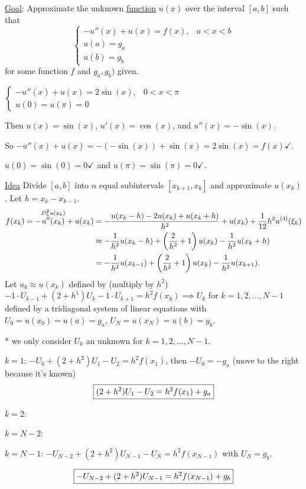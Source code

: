 \documentclass[]{article}
\begin{document}
\ul{Goal}: Approximate the unknown \ul{function} $u(x)$ over the interval $[a,b]$ such that
$$ \begin{cases} -u''(x) + u(x) = f(x), & a<x<b \\ u(a) = g_a \\ u(b) = g_b \end{cases} $$
for some function $f$ and $g_a,g_b)$ given.
\begin{example}
	$\begin{cases} -u''(x)+u(x)=2\sin(x), & 0<x<\pi \\ u(0)=u(\pi)=0 \end{cases} $
	
	Then $u(x) = \sin(x)$, $u'(x) = \cos(x)$, and $u''(x)=-\sin(x)$.
	
	So $-u''(x)+u(x) = -(-\sin(x))+\sin(x) = 2\sin(x) = f(x) \checkmark$.
	
	$u(0)=\sin(0)=0\checkmark$ and $u(\pi)=\sin(\pi)=0\checkmark$.
\end{example}
\ul{Idea} Divide $[a,b]$ into $n$ equal subintervals $[x_{k+1},x_k]$ and approximate $u(x_k)$.
Let $h=x_k-x_{k-1}$.
\begin{align*}
	f(x_k) = -\overset{D_h^2u(x_k)}{u''(x_k)} + u(x_k) 
		   &= -\frac{u(x_k-h)-2u(x_k)+u(x_k+h)}{h^2} + u(x_k) + \frac1{12}h^2 u^{(4)}(\xi_k) \\
		   &\approx -\frac1{h^2}u(x_k-h) + \left(\frac2{h^2}+1\right)u(x_k) - \frac1{h^2}u(x_k+h) \\
		   &= -\frac1{h^2}u(x_{k-1}) + \left(\frac2{h^2}+1\right)u(x_k) - \frac1{h^2}u(x_{k+1}).
\end{align*}
Let $u_k \approx u(x_k)$ defined by (multiply by $h^2$)
$ -1\cdot U_{k-1} + (2+h^1)U_k-1\cdot U_{k+1} = h^2f(x_k) \implies U_k$ for $k=1,2,\dots,N-1$ defined by a tridiagonal system of linear equations with $U_0=u(x_0)=u(a)=g_a$, $U_N=u(x_N)=u(b)=g_b$.

$*$ we only consider $U_k$ an unknown for $k=1,2,\dots,N-1$.

\ul{$k=1$}: $-U_0+(2+h^2)U_1-U_2=h^2f(x_1)$, then $-U_0=-g_a$ (move to the right because it's known) $$\fbox{$(2+h^2)U_1-U_2=h^2f(x_1)+g_a$}$$

\ul{$k=2$}: 

\ul{$k=N-2$}: 

\ul{$k=N-1$}: $-U_{N-2} + (2+h^2)U_{N-1} - U_N = h^2f(x_{N-1})$ with $U_N=g_b$.

$$\fbox{$-U_{N-2}+(2+h^2)U_{N-1} = h^2f(x_{N-1}) + g_b$}$$
\end{document}
